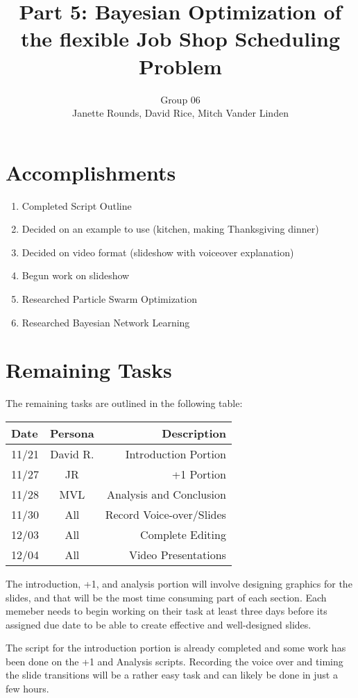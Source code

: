 \documentclass[11pt,twocolumn]{article}
\title{Part 5: Bayesian Optimization of the flexible Job Shop Scheduling Problem}
\author{Group 06 \\ 
\small Janette Rounds, \small David Rice, \small Mitch Vander Linden}
\begin{document}
	\section{Accomplishments}
	\begin{enumerate}
		\item Completed Script Outline
		\item Decided on an example to use (kitchen, making Thanksgiving dinner)
		\item Decided on video format (slideshow with voiceover explanation)
		\item Begun work on slideshow
		\item Researched Particle Swarm Optimization
		\item Researched Bayesian Network Learning
	\end{enumerate}
	\section{Remaining Tasks}
	The remaining tasks are outlined in the following table:
	
	\begin{table}[h!]
	\centering
	\begin{tabular}{ |l | c | r|}
	  \hline
	  Date & Persona & Description \\
	  \hline
	  \hline
	  11/21 & David R. & Introduction Portion \\
	  \hline
	  11/27 & JR & +1 Portion \\
	  \hline
	  11/28 & MVL & Analysis and Conclusion \\
	  \hline
	  11/30 & All & Record Voice-over/Slides \\
	  \hline
	  12/03 & All & Complete Editing \\
	  \hline
	  12/04 & All & Video Presentations \\
	  \hline
	\end{tabular}
	\end{table}
	
	The introduction, +1, and analysis portion will involve designing graphics for the slides, and that will be the most time consuming part of each section.  Each memeber needs to begin working on their task at least three days before its assigned due date to be able to create effective and well-designed slides.
	
	The script for the introduction portion is already completed and some work has been done on the +1 and Analysis scripts.  Recording the voice over and timing the slide transitions will be a rather easy task and can likely be done in just a few hours.
	
\end{document}
